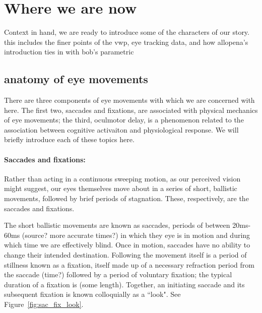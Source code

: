 \documentclass{article}
\begin{document}
\section{Where we are now}

Context in hand, we are ready to introduce some of the characters of our story. this includes the finer points of the vwp, eye tracking data, and how allopena's introduction ties in with bob's parametric

\subsection{anatomy of eye  movements}

There are three components of eye movements with which we are concerned with here. The first two, saccades and fixations, are associated with physical mechanics of eye movements; the third, oculmotor delay, is a phenomenon related to the association between cognitive activaiton and physiological response. We will briefly introduce each of these topics here. 

\paragraph{Saccades and fixations:} Rather than acting in a continuous sweeping motion, as our perceived vision might suggest, our eyes themselves move about in a series of short, ballistic movements, followed by brief periods of stagnation. These, respectively, are the saccades and fixations. 

The short ballistic movements are known as saccades, periods of between 20ms-60ms (source? more accurate times?) in which they eye is in motion and during which time we are effectively blind. Once in motion, saccades have no ability to change their intended destination. Following the movement itself is a period of stillness known as a fixation, itself made up of a necessary refraction period from the saccade (time?) followed by a period of voluntary fixation; the typical duration of a fixation is (some length). Together, an initiating saccade and its subsequent fixation is known colloquially as a ``look". See Figure~\ref{fig:sac_fix_look}.
\end{document}
